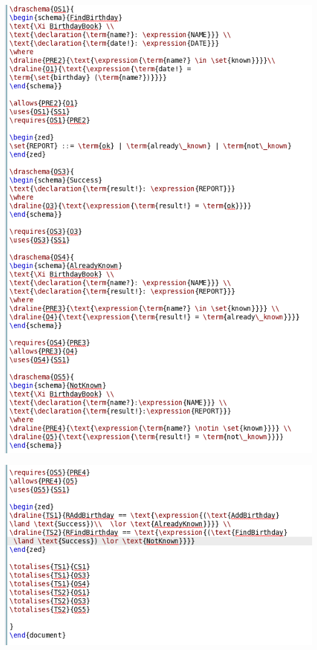 \noindent \includegraphics[scale=0.5]{examples/bb/1n2imageb.png}

\noindent \includegraphics[scale=0.5]{examples/bb/1n2imagec.png}
%
